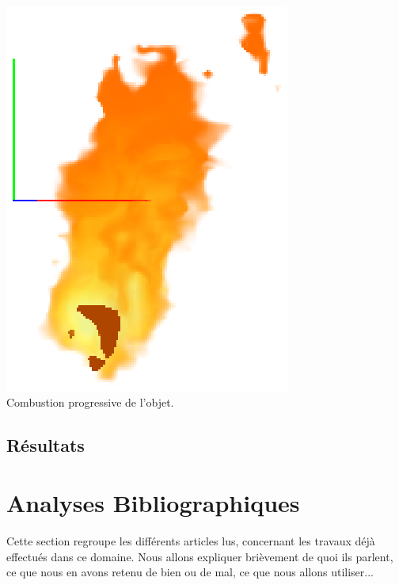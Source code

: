 \documentclass[a4paper,10pt]{article}
\begin{document}
\begin{center}
	\includegraphics[scale=0.6]{Decomposition5.ps}\\
	Combustion progressive de l'objet.
    \end{center}  
    
\subsection{Résultats}





\newpage
\section{Analyses Bibliographiques}
Cette section regroupe les différents articles lus, concernant les travaux déjà effectués dans ce domaine. 
Nous allons expliquer brièvement de quoi ils parlent, ce que nous en avons retenu de bien ou de mal, ce que nous allons 
utiliser...
\end{document}
